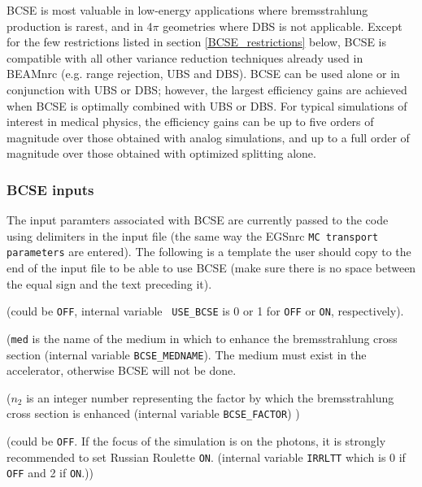 \documentclass[12pt,twoside]{article}
\begin{document}
BCSE is most valuable in low-energy applications where bremsstrahlung
production is rarest, and in 4$\pi$ geometries where DBS is not
applicable. Except for the few restrictions listed in section
\ref{BCSE_restrictions} below, BCSE is compatible with all other
variance reduction techniques already used in BEAMnrc (e.g. range
rejection, UBS and DBS). BCSE can be used alone or in conjunction with
UBS or DBS; however, the largest efficiency gains are achieved when
BCSE is optimally combined with UBS or DBS. For typical simulations of
interest in medical physics, the efficiency gains can be up to five
orders of magnitude over those obtained with analog simulations, and
up to a full order of magnitude over those obtained with optimized
splitting alone.

\subsubsection{BCSE inputs}

\noindent The input paramters associated with BCSE  are currently passed
to the code using delimiters in the input file (the same way the EGSnrc
{\tt MC transport parameters} are entered). The following is a template
the user should copy to the end of the input file to be able to use
BCSE (make sure there is no space between the equal sign and the text
preceding it).


 (could be {\tt OFF}, internal variable {\tt
USE\_BCSE} is 0 or 1 for {\tt OFF} or {\tt ON}, respectively).

 ({\tt med} is the name of
the medium in which to enhance the bremsstrahlung cross
section (internal variable {\tt BCSE\_MEDNAME}).  The medium must exist
in the accelerator, otherwise BCSE will not be done.


 ($n_{2}$ is an integer number
representing the factor by which the bremsstrahlung cross section is
enhanced (internal variable {\tt BCSE\_FACTOR}) )

 (could be {\tt OFF}. If the focus of
the simulation
is on the photons, it is strongly recommended to set Russian Roulette
{\tt ON}. (internal variable {\tt IRRLTT} which is 0 if {\tt OFF} and 2 if
{\tt ON}.))
\end{document}

